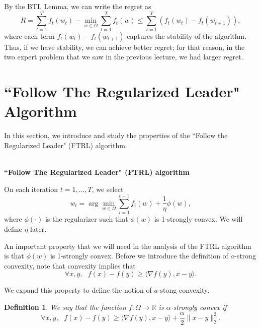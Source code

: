 \documentclass[11pt]{article}
\newtheorem{definition}[theorem]{Definition}
\begin{document}
\noindent By the BTL Lemma, we can write the regret as 
\begin{equation*}
    R = \sum_{t=1}^Tf_t(w_t) - \min_{w \in \Omega} \sum_{t=1}^T f_t (w) \leq \sum_{t=1}^T (f_t (w_t) - f_t(w_{t+1})),
\end{equation*}
where each term $f_t (w_t) - f_t(w_{t+1})$ captures the stability of the algorithm. 
Thus, if we have stability, we can achieve better regret;
for that reason, in the two expert problem that we saw in the previous lecture, we had larger regret.

\section{``Follow The Regularized Leader" Algorithm}

In this section, we introduce and study the properties of the ``Follow the Regularized Leader" (FTRL) algorithm.

~\\\noindent\textbf{``Follow The Regularized Leader" (FTRL) algorithm }

\noindent On each iteration $t = 1, \ldots, T$, we select 
\begin{equation}
\label{eq:w_t_definition_FTRL}
w_t = \arg \min_{w \in \Omega} \sum_{i=1}^{t-1} f_i (w) + \frac{1}{\eta}\phi(w),    
\end{equation}
 where $\phi(\cdot)$ is the regularizer such that $\phi(w)$ is 1-strongly convex. 
 We will define $\eta$ later.

An important property that we will need in the analysis of the FTRL algorithm is that $\phi(w)$ is 1-strongly convex. 
Before we introduce the definition of $a$-strong convexity, note that convexity implies that
\begin{equation*}
    \forall x, y, \text{    }  f(x) - f(y) \geq \langle \nabla f(y), x-y \rangle.
\end{equation*}

\noindent We expand this property to define the notion of $a$-stong convexity.

\begin{definition}
We say that  the function $f: \Omega \rightarrow \mathbb{R}$ is \textit{$\alpha$-strongly convex} if
\begin{equation}
    \label{eq:strong_convexity_def}
    \forall x, y, \text{    }  f(x)- f(y) \geq
    \langle \nabla f(y), x-y \rangle + \frac{\alpha}{2} \| x-y\|_2^2.
\end{equation}
\end{definition}
\end{document}
